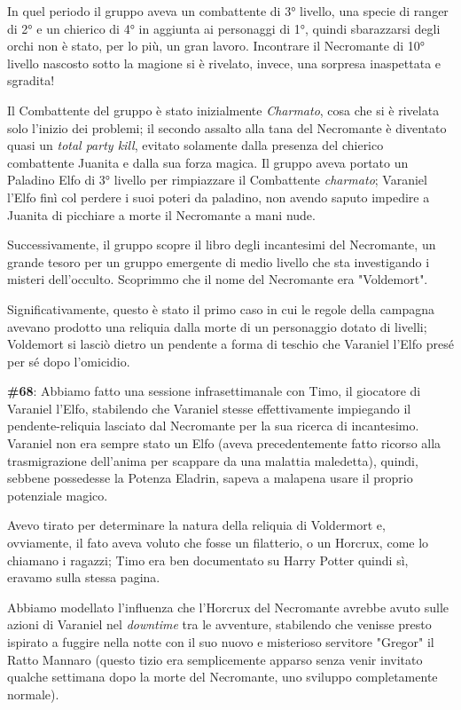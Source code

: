 In quel periodo il gruppo aveva un combattente di 3° livello, una specie di ranger di 2° e un chierico di 4° in aggiunta ai personaggi di 1°, quindi sbarazzarsi degli orchi non è stato, per lo più, un gran lavoro. Incontrare il Necromante di 10° livello nascosto sotto la magione si è rivelato, invece, una sorpresa inaspettata e sgradita!

Il Combattente del gruppo è stato inizialmente \textit{Charmato}, cosa che si è rivelata solo l'inizio dei problemi; il secondo assalto alla tana del Necromante è diventato quasi un \textit{total party kill}, evitato solamente dalla presenza del chierico combattente Juanita e dalla sua forza magica. Il gruppo aveva portato un Paladino Elfo di 3° livello per rimpiazzare il Combattente \textit{charmato}; Varaniel l'Elfo finì col perdere i suoi poteri da paladino, non avendo saputo impedire a Juanita di picchiare a morte il Necromante a mani nude.

Successivamente, il gruppo scopre il libro degli incantesimi del Necromante, un grande tesoro per un gruppo emergente di medio livello che sta investigando i misteri dell'occulto. Scoprimmo che il nome del Necromante era "Voldemort".

Significativamente, questo è stato il primo caso in cui le regole della campagna avevano prodotto una reliquia dalla morte di un personaggio dotato di livelli; Voldemort si lasciò dietro un pendente a forma di teschio che Varaniel l'Elfo presé per sé dopo l'omicidio.

\textbf{\#68}: Abbiamo fatto una sessione infrasettimanale con Timo, il giocatore di Varaniel l'Elfo, stabilendo che Varaniel stesse effettivamente impiegando il pendente-reliquia lasciato dal Necromante per la sua ricerca di incantesimo. Varaniel non era sempre stato un Elfo (aveva precedentemente fatto ricorso alla trasmigrazione dell'anima per scappare da una malattia maledetta), quindi, sebbene possedesse la Potenza Eladrin, sapeva a malapena usare il proprio potenziale magico.

Avevo tirato per determinare la natura della reliquia di Voldermort e, ovviamente, il fato aveva voluto che fosse un filatterio, o un Horcrux, come lo chiamano i ragazzi; Timo era ben documentato su Harry Potter quindi sì, eravamo sulla stessa pagina.

Abbiamo modellato l'influenza che l'Horcrux del Necromante avrebbe avuto sulle azioni di Varaniel nel \textit{downtime} tra le avventure, stabilendo che venisse presto ispirato a fuggire nella notte con il suo nuovo e misterioso servitore "Gregor" il Ratto Mannaro (questo tizio era semplicemente apparso senza venir invitato qualche settimana dopo la morte del Necromante, uno sviluppo completamente normale).

